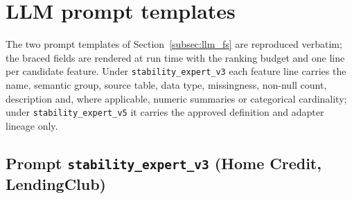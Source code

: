 \documentclass[final,5p,twocolumn]{elsarticle}
\begin{document}
\appendix
\section{LLM prompt templates}
\label{app:prompts}

The two prompt templates of Section~\ref{subsec:llm_fs} are reproduced verbatim; the braced fields are rendered at run time with the ranking budget and one line per candidate feature. Under \texttt{stability\_expert\_v3} each feature line carries the name, semantic group, source table, data type, missingness, non-null count, description and, where applicable, numeric summaries or categorical cardinality; under \texttt{stability\_expert\_v5} it carries the approved definition and adapter lineage only.

\subsection{Prompt \texttt{stability\_expert\_v3} (Home Credit, LendingClub)}
\end{document}
